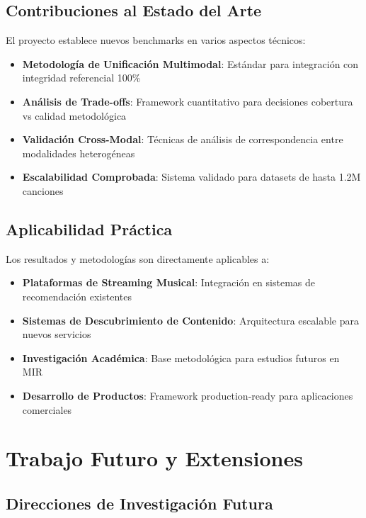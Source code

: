 \documentclass[12pt,a4paper]{report}
\begin{document}
\subsection{Contribuciones al Estado del Arte}

El proyecto establece nuevos benchmarks en varios aspectos técnicos:

\begin{itemize}
\item \textbf{Metodología de Unificación Multimodal}: Estándar para integración con integridad referencial 100\%
\item \textbf{Análisis de Trade-offs}: Framework cuantitativo para decisiones cobertura vs calidad metodológica
\item \textbf{Validación Cross-Modal}: Técnicas de análisis de correspondencia entre modalidades heterogéneas
\item \textbf{Escalabilidad Comprobada}: Sistema validado para datasets de hasta 1.2M canciones
\end{itemize}

\subsection{Aplicabilidad Práctica}

Los resultados y metodologías son directamente aplicables a:

\begin{itemize}
\item \textbf{Plataformas de Streaming Musical}: Integración en sistemas de recomendación existentes
\item \textbf{Sistemas de Descubrimiento de Contenido}: Arquitectura escalable para nuevos servicios
\item \textbf{Investigación Académica}: Base metodológica para estudios futuros en MIR
\item \textbf{Desarrollo de Productos}: Framework production-ready para aplicaciones comerciales
\end{itemize}

\section{Trabajo Futuro y Extensiones}

\subsection{Direcciones de Investigación Futura}
\end{document}
